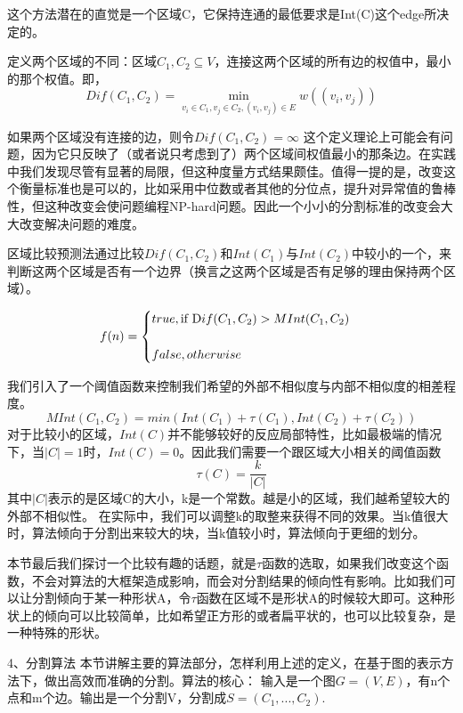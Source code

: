这个方法潜在的直觉是一个区域C，它保持连通的最低要求是Int(C)这个edge所决定的。

定义两个区域的不同：区域\(C_1,C_2 \subseteq V\)，连接这两个区域的所有边的权值中，最小的那个权值。即，
\begin{equation}
Dif(C_1,C_2) = \mathop {\min }\limits_{v_i \in C_1 ,v_j \in C_2, (v_i,v_j) \in E}w((v_i,v_j))
\end{equation}

如果两个区域没有连接的边，则令\(Dif(C_1,C_2) = \infty\)
这个定义理论上可能会有问题，因为它只反映了（或者说只考虑到了）两个区域间权值最小的那条边。在实践中我们发现尽管有显著的局限，但这种度量方式结果颇佳。值得一提的是，改变这个衡量标准也是可以的，比如采用中位数或者其他的分位点，提升对异常值的鲁棒性，但这种改变会使问题编程NP-hard问题。因此一个小小的分割标准的改变会大大改变解决问题的难度。

区域比较预测法通过比较\(Dif(C_1,C_2)\)和\(Int(C_1)\)与\(Int(C_2)\)中较小的一个，来判断这两个区域是否有一个边界（换言之这两个区域是否有足够的理由保持两个区域）。

\begin{equation}
f(n) =\begin{cases} 
true,   \mbox {if } \mbox Dif(C_1,C_2) > M Int(C_1,C_2)\\\\
false,  otherwise \end{cases}
\end{equation}

我们引入了一个阈值函数来控制我们希望的外部不相似度与内部不相似度的相差程度。
\begin{equation}
MInt(C_1,C_2) = min(Int(C_1) + \tau(C_1),Int(C_2) + \tau(C_2))
\end{equation}
对于比较小的区域，\(Int(C)\)并不能够较好的反应局部特性，比如最极端的情况下，当\(|C| = 1\)时，\(Int(C) = 0\)。因此我们需要一个跟区域大小相关的阈值函数
\[\tau (C) = \frac{k}{|C|}\]
其中\(|C|\)表示的是区域C的大小，k是一个常数。越是小的区域，我们越希望较大的外部不相似性。
在实际中，我们可以调整k的取整来获得不同的效果。当k值很大时，算法倾向于分割出来较大的块，当k值较小时，算法倾向于更细的划分。

本节最后我们探讨一个比较有趣的话题，就是\(\tau\)函数的选取，如果我们改变这个函数，不会对算法的大框架造成影响，而会对分割结果的倾向性有影响。比如我们可以让分割倾向于某一种形状A，令\(\tau\)函数在区域不是形状A的时候较大即可。这种形状上的倾向可以比较简单，比如希望正方形的或者扁平状的，也可以比较复杂，是一种特殊的形状。

4、分割算法
本节讲解主要的算法部分，怎样利用上述的定义，在基于图的表示方法下，做出高效而准确的分割。算法的核心：
输入是一个图\(G=(V,E)\)，有n个点和m个边。输出是一个分割V，分割成\(S=(C_1,...,C_2).\)


